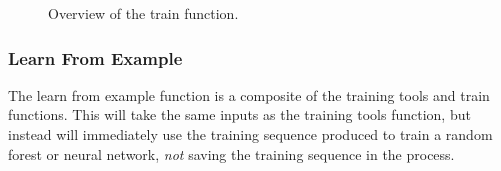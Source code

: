 \documentclass[12pt,twoside,notitlepage]{report}
\begin{document}
\begin{figure}[H]
{\begin{tikzpicture}[node distance=2cm,>=stealth',bend angle=45,auto]
                                    
                            \end{tikzpicture}
                        }

                    \caption{Overview of the train function.}
                \end{figure} 



            \subsubsection{Learn From Example}
                The learn from example function is a composite of the training tools and train functions. This will 
                take the same inputs as the training tools function, but instead will immediately use the training 
                sequence produced to train a random forest or neural network, \textit{not} saving the training 
                sequence in the process.
\end{document}
